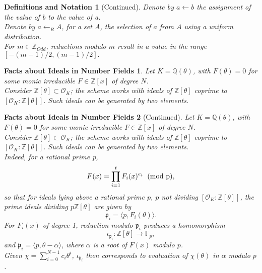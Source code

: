 \documentclass{beamer}
\newtheorem{defsnota}{Definitions and Notation}
\newtheorem{fainf}{Facts about Ideals in Number Fields}
\begin{document}
\begin{frame}
\begin{small}
\begin{defsnota}[Continued]
Denote by $a\leftarrow b$ the assignment of the value of b to the value of a. 
\\Denote by $a\leftarrow_RA$, for a set $A$, the selection of $a$ from $A$ using a uniform distribution. 
\\For $m\in \mathbb{Z}_{Odd}$, reductions modulo $m$ result in a value in the range $[-(m-1)/2,(m-1)/2].$
\end{defsnota}
\pause
\begin{fainf}
Let $K = \mathbb{Q}(\theta)$, with $F(\theta) = 0$ for some monic irreducible $F\in \mathbb{Z}[x]$ of degree $N$.
\\Consider $\mathbb{Z}[\theta] \subset \mathcal{O}_K$; the scheme works with ideals of $\mathbb{Z}[\theta]$ coprime to  $[\mathcal{O}_K : \mathbb{Z}[\theta]].$ Such ideals can be generated by two elements.
\end{fainf}
\end{small}
\end{frame}

\begin{frame}
\begin{small}
\begin{fainf}[Continued]
Let $K = \mathbb{Q}(\theta)$, with $F(\theta) = 0$ for some monic irreducible $F\in \mathbb{Z}[x]$ of degree $N$.
\\Consider $\mathbb{Z}[\theta] \subset \mathcal{O}_K$; the scheme works with ideals of $\mathbb{Z}[\theta]$ coprime to  $[\mathcal{O}_K : \mathbb{Z}[\theta]].$ Such ideals can be generated by two elements.
\\Indeed, for a rational prime p,
$$F(x) = \prod_{i = 1}^t F_i(x)^{e_i} \hspace{2mm} \text{(mod p)},$$
so that for ideals lying above a rational prime $p$,  $p$ not dividing $[\mathcal{O}_K : \mathbb{Z}[\theta]]$, the prime ideals dividing $p\mathbb{Z}[\theta]$ are given by 
$$\mathfrak{p}_i = \langle p,F_i(\theta)\rangle.$$ For $F_i(x)$ of degree 1, reduction modulo $\mathfrak{p}_i$ produces a homomorphism 
$$\iota_{\mathfrak{p}_i }:\mathbb{Z}[\theta]\rightarrow \mathbb{F}_p,$$
and $\mathfrak{p}_i = \langle p, \theta - \alpha \rangle$, where $\alpha$ is a root of $F(x)$ modulo $p$.
\\Given $\chi = \sum_{i = 0}^{N-1}c_i\theta^i$, $\iota_{\mathfrak{p}_i }$ then corresponds to evaluation of $\chi(\theta)$ in $\alpha$ modulo $p$.
\end{fainf}
\end{small}
\end{frame}
\end{document}
